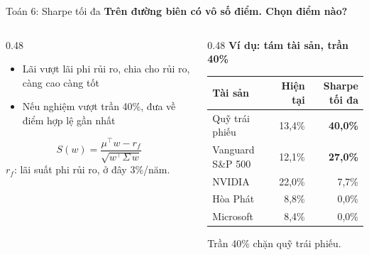 \documentclass[aspectratio=169,10pt]{beamer}
\newcommand{\pos}[1]{\textbf{#1}}
\newcommand{\con}[1]{\textcolor{black!50}{#1}}
\let\small\normalsize
\newcommand{\lead}[1]{{\color{structure}\bfseries #1}\par\vspace{5pt}}
\begin{document}
\begin{frame}[t]{Toán 6: Sharpe tối đa}
  \lead{Trên đường biên có vô số điểm. Chọn điểm nào?}
  \begin{columns}[T]
    \begin{column}{0.48\textwidth}
      \begin{itemize}
        \item Lãi vượt lãi phi rủi ro, chia cho rủi ro, càng cao càng tốt \cite{sharpe}
        \item Nếu nghiệm vượt trần 40\%, đưa về điểm hợp lệ gần nhất
      \end{itemize}
      \[ S(w)=\frac{\mu^{\top}w-r_f}{\sqrt{w^{\top}\Sigma\,w}} \]
      {\small \(r_f\): lãi suất phi rủi ro, ở đây 3\%/năm.}
    \end{column}
    \begin{column}{0.48\textwidth}
      \textbf{Ví dụ: tám tài sản, trần 40\%}
      \vspace{2pt}

      \setlength{\tabcolsep}{3pt}
      \begin{tabular}{@{}lrr@{}}
        \toprule
        Tài sản & Hiện tại & Sharpe tối đa \\
        \midrule
        Quỹ trái phiếu & 13,4\% & \pos{40,0\%} \\
        Vanguard S\&P 500 & 12,1\% & \pos{27,0\%} \\
        NVIDIA & 22,0\% & 7,7\% \\
        Hòa Phát & 8,8\% & \con{0,0\%} \\
        Microsoft & 8,4\% & \con{0,0\%} \\
        \bottomrule
      \end{tabular}

      \vspace{2pt}
      {\small Trần 40\% chặn quỹ trái phiếu.}
    \end{column}
  \end{columns}
\end{frame}
\end{document}
